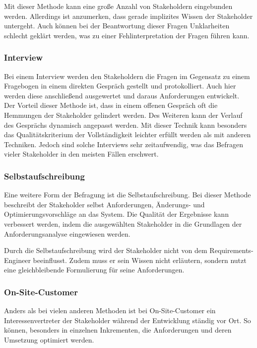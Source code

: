 Mit dieser Methode kann eine große Anzahl von Stakeholdern eingebunden werden. Allerdings ist anzumerken, dass gerade implizites Wissen der Stakeholder untergeht. Auch können bei der Beantwortung dieser Fragen Unklarheiten schlecht geklärt werden, was zu einer Fehlinterpretation der Fragen führen kann.

\subsubsection{Interview}
\label{subsubsec:interview}
Bei einem Interview werden den Stakeholdern die Fragen im Gegensatz zu einem Fragebogen in einem direkten Gespräch gestellt und protokolliert. Auch hier werden diese anschließend ausgewertet und daraus Anforderungen entwickelt.\\

Der Vorteil dieser Methode ist, dass in einem offenen Gespräch oft die Hemmungen der Stakeholder gelindert werden. Des Weiteren kann der Verlauf des Gesprächs dynamisch angepasst werden. Mit dieser Technik kann besonders das Qualitätskriterium der Vollständigkeit leichter erfüllt werden als mit anderen Techniken. Jedoch sind solche Interviews sehr zeitaufwendig, was das Befragen vieler Stakeholder in den meisten Fällen erschwert.

\subsubsection{Selbstaufschreibung}
Eine weitere Form der Befragung ist die Selbstaufschreibung. Bei dieser Methode beschreibt der Stakeholder selbst Anforderungen, Änderungs- und Optimierungsvorschläge an das System. Die Qualität der Ergebnisse kann verbessert werden, indem die ausgewählten Stakeholder in die Grundlagen der Anforderungsanalyse eingewiesen werden.

Durch die Selbstaufschreibung wird der Stakeholder nicht von dem Requirements-Engineer beeinflusst. Zudem muss er sein Wissen nicht erläutern, sondern nutzt eine gleichbleibende Formulierung für seine Anforderungen.

\subsubsection{On-Site-Customer}
Anders als bei vielen anderen Methoden ist bei On-Site-Customer ein Interessenvertreter der Stakeholder während der Entwicklung ständig vor Ort. So können, besonders in einzelnen Inkrementen, die Anforderungen und deren Umsetzung optimiert werden.\\

